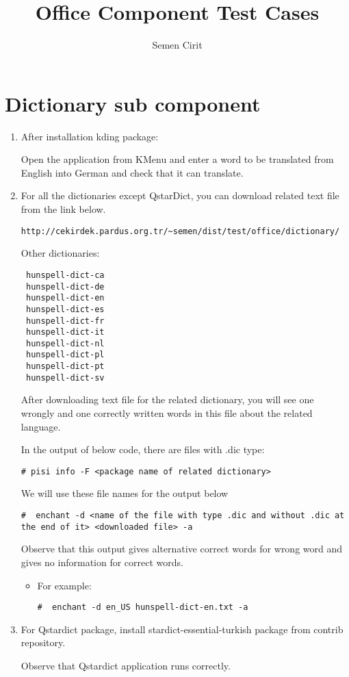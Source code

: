 \documentclass[a4paper,10pt]{article}
\title{Office Component Test Cases}
\author{Semen Cirit}
\begin{document}
\maketitle
\section{Dictionary sub component}
\begin{enumerate}
 \item After installation kding package:

Open the application from KMenu and enter a word to be translated from English into German and check that it can translate.
 \item For all the dictionaries except QstarDict, you can download related text file from the link below.
\begin{verbatim}
http://cekirdek.pardus.org.tr/~semen/dist/test/office/dictionary/
\end{verbatim}

Other dictionaries:
\begin{verbatim}
 hunspell-dict-ca
 hunspell-dict-de
 hunspell-dict-en
 hunspell-dict-es
 hunspell-dict-fr
 hunspell-dict-it
 hunspell-dict-nl
 hunspell-dict-pl
 hunspell-dict-pt
 hunspell-dict-sv
\end{verbatim}

After downloading text file for the related dictionary, you will see one wrongly and one correctly written words in this file about the related language.

In the output of below code, there are files with .dic type:
\begin{verbatim}
# pisi info -F <package name of related dictionary> 
\end{verbatim}

We will use these file names for the output below
\begin{verbatim}
#  enchant -d <name of the file with type .dic and without .dic at the end of it> <downloaded file> -a
\end{verbatim}

Observe that this output gives alternative correct words for wrong word and gives no information for correct words.

\begin{itemize}
 \item For example: 
\begin{verbatim}
#  enchant -d en_US hunspell-dict-en.txt -a
\end{verbatim}

\end{itemize}
 \item For Qstardict package, install stardict-essential-turkish package from contrib repository.

	Observe that Qstardict application runs correctly.
\end{enumerate}
\end{document}
